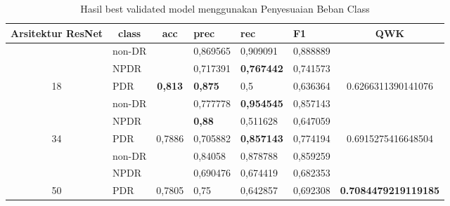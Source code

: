 \begin{table}[H]
	\begin{center}
		\caption{Hasil best validated model menggunakan Penyesuaian Beban Class}
		\label{tb:HasilValClassWeight}
		\begin{tabular}{|c|l|c|l|l|l|c|}
			\hline
			\rowcolor[HTML]{C0C0C0} 
			Arsitektur ResNet     & \multicolumn{1}{c|}{\cellcolor[HTML]{C0C0C0}class} & acc                      & prec     & rec      & F1       & QWK                                  \\ \hline
			& non-DR                                             &                          & 0,869565 & 0,909091 & 0,888889 &                                      \\ \cline{2-2} \cline{4-6}
			& NPDR                                               &                          & 0,717391 & \textbf{0,767442} & 0,741573 &                             \\ \cline{2-2} \cline{4-6}
			\multirow{-3}{*}{18}  & PDR                                                & \multirow{-3}{*}{\textbf{0,813}}  & \textbf{0,875}    & 0,5      & 0,636364 & \multirow{-3}{*}{0.6266311390141076} \\ \hline
			& non-DR                                             &                          & 0,777778 & \textbf{0,954545} & 0,857143 &                             \\ \cline{2-2} \cline{4-6}
			& NPDR                                               &                          & \textbf{0,88}     & 0,511628 & 0,647059 &                              \\ \cline{2-2} \cline{4-6}
			\multirow{-3}{*}{34}  & PDR                                                & \multirow{-3}{*}{0,7886} & 0,705882 & \textbf{0,857143} & 0,774194 & \multirow{-3}{*}{0.6915275416648504} \\ \hline
			& non-DR                                             &                          & 0,84058  & 0,878788 & 0,859259 &                                      \\ \cline{2-2} \cline{4-6}
			& NPDR                                               &                          & 0,690476 & 0,674419 & 0,682353 &                                      \\ \cline{2-2} \cline{4-6}
			\multirow{-3}{*}{50}  & PDR                                                & \multirow{-3}{*}{0,7805} & 0,75     & 0,642857 & 0,692308 & \multirow{-3}{*}{\textbf{0.7084479219119185}} \\ \hline

\end{tabular}
\end{center}
\end{table}
